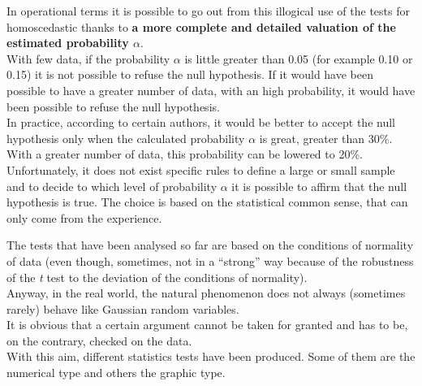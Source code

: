 \begin{frame}
  \begin{small}
    \vspace*{.25cm}
    In operational terms it is possible to go out from this illogical use of the tests for homoscedastic thanks to  \textbf{a more complete and detailed valuation of the estimated probability {\boldmath $ \alpha $}}.\\
    With few data, if the probability $ \alpha $ is little greater than 0.05 (for example 0.10 or 0.15) it is not possible to refuse the null hypothesis. If it would have been possible to have a greater number of data, with an high probability, it would have been possible to refuse the null hypothesis.\\
    \vspace*{.25cm}
    In practice, according to certain authors, it would be better to accept the null hypothesis only when the calculated probability $ \alpha $ is great, greater than 30\%. With a greater number of data, this probability can be lowered to 20\%. Unfortunately, it does not exist specific rules to define a large or small sample and to decide to which level of probability $ \alpha $ it is possible to affirm that the null hypothesis is true. The choice is based on the statistical common sense, that can only come from the experience.
  \end{small}
\end{frame}




\begin{frame}
  \vspace*{.25cm}
  The tests that have been analysed so far are based on the conditions of normality of data (even though, sometimes, not in a ``strong'' way because of the robustness of the \textit{t} test to the deviation of the conditions of normality).\\
  \vspace*{.25cm}
  Anyway, in the real world, the natural phenomenon does not always (sometimes rarely) behave like Gaussian random variables.\\
  \vspace*{.25cm}
  It is obvious that a certain argument cannot be taken for granted and has to be, on the contrary, checked on the data.\\
  \vspace*{.25cm}
  With this aim, different statistics tests have been produced. Some of them are the numerical type and others the graphic type.
\end{frame}

